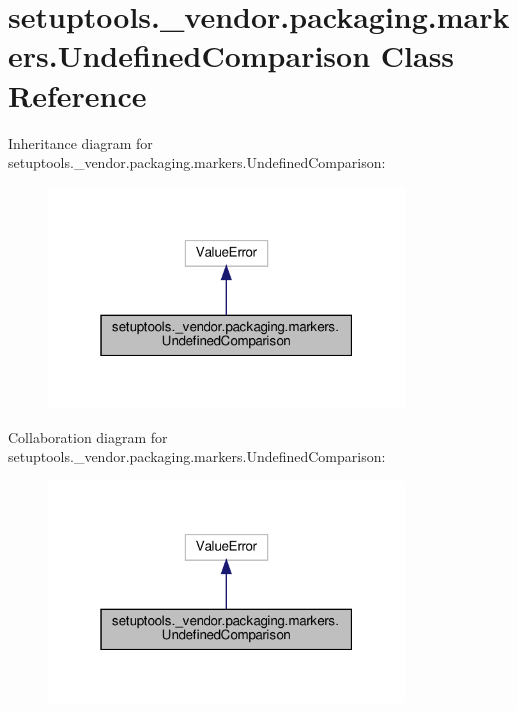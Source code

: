 \hypertarget{classsetuptools_1_1__vendor_1_1packaging_1_1markers_1_1UndefinedComparison}{}\section{setuptools.\+\_\+vendor.\+packaging.\+markers.\+Undefined\+Comparison Class Reference}
\label{classsetuptools_1_1__vendor_1_1packaging_1_1markers_1_1UndefinedComparison}


Inheritance diagram for setuptools.\+\_\+vendor.\+packaging.\+markers.\+Undefined\+Comparison\+:
\nopagebreak
\begin{figure}[H]
\begin{center}
\leavevmode
\includegraphics[width=268pt]{classsetuptools_1_1__vendor_1_1packaging_1_1markers_1_1UndefinedComparison__inherit__graph}
\end{center}
\end{figure}


Collaboration diagram for setuptools.\+\_\+vendor.\+packaging.\+markers.\+Undefined\+Comparison\+:
\nopagebreak
\begin{figure}[H]
\begin{center}
\leavevmode
\includegraphics[width=268pt]{classsetuptools_1_1__vendor_1_1packaging_1_1markers_1_1UndefinedComparison__coll__graph}
\end{center}
\end{figure}


